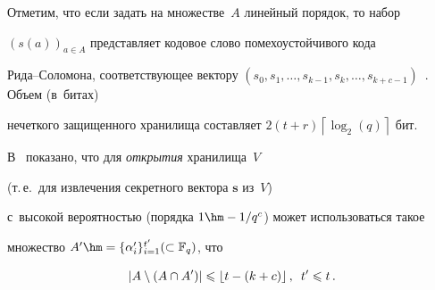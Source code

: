 Отметим, что если задать на множестве~$A$ линейный порядок, то набор 


$(s(a))_{a\in A}$ представляет кодовое слово помехоустойчивого кода 


Ри\-да--Со\-ло\-мо\-на, соответствующее вектору $(s_0,s_1,\ldots,s_{k-1},


s_k,\ldots,s_{k+c-1})$~\cite{Jue2006}. Объем (в~битах)  


нечеткого защищенного хранилища составляет $2(t+r) \left\lceil 


\log_2(q)\right\rceil$ бит.





В~\cite{Ulu2005} показано, что для \textit{открытия} хранилища~$V$ 


(т.\,е.\ для извлечения секретного вектора $\mathbf{s}$ из~$V$) 


с~высокой вероятностью (порядка $1\hm-1/q^{c}$) может использоваться такое 


множество $A'\hm=\{\alpha'_i\}_{i=1}^{t'} (\subset\mathbb{F}_q)$, что


\begin{equation}


\label{for_utv}


\left\vert A\setminus \left(A\cap A'\right)\right\vert \leqslant 


\left\lfloor {t-(k+c)}\right\rfloor,\enskip t'\leqslant t\,.


\end{equation}





